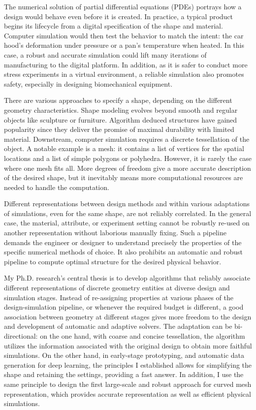 

The numerical solution of partial differential equations (PDEs) portrays how a design would behave even before it is created. In practice, a typical product begins its lifecycle from a digital specification of the shape and material. Computer simulation would then test the behavior to match the intent: the car hood's deformation under pressure or a pan's temperature when heated. In this case, a robust and accurate simulation could lift many iterations of manufacturing to the digital platform. In addition, as it is safer to conduct more stress experiments in a virtual environment, a reliable simulation also promotes safety, especially in designing biomechanical equipment. 

There are various approaches to specify a shape, depending on the different geometry characteristics. Shape modeling evolves beyond smooth and regular objects like sculpture or furniture. Algorithm deduced structures have gained popularity since they deliver the promise of maximal durability with limited material. Downstream, computer simulation requires a discrete tessellation of the object. A notable example is a mesh: it contains a list of vertices for the spatial locations and a list of simple polygons or polyhedra. However, it is rarely the case where one mesh fits all. More degrees of freedom give a more accurate description of the desired shape, but it inevitably means more computational resources are needed to handle the computation.

Different representations between design methods and within various adaptations of simulations, even for the same shape, are not reliably correlated. In the general case, the material, attribute, or experiment setting cannot be robustly re-used on another representation without laborious manually fixing. Such a pipeline demands the engineer or designer to understand precisely the properties of the specific numerical methods of choice. It also prohibits an automatic and robust pipeline to compute optimal structure for the desired physical behavior.

My Ph.D. research's central thesis is to develop algorithms that reliably associate different representations of discrete geometry entities at diverse design and simulation stages. Instead of re-assigning properties at various phases of the design-simulation pipeline, or whenever the required budget is different, a good association between geometry at different stages gives more freedom to the design and development of automatic and adaptive solvers. The adaptation can be bi-directional: on the one hand, with coarse and concise tessellation, the algorithm utilizes the information associated with the original design to obtain more faithful simulations. On the other hand, in early-stage prototyping, and automatic data generation for deep learning, the principles I established allows for simplifying the shape and retaining the settings, providing a fast answer. In addition, I use the same principle to design the first large-scale and robust approach for curved mesh representation, which provides accurate representation as well as efficient physical simulations.

